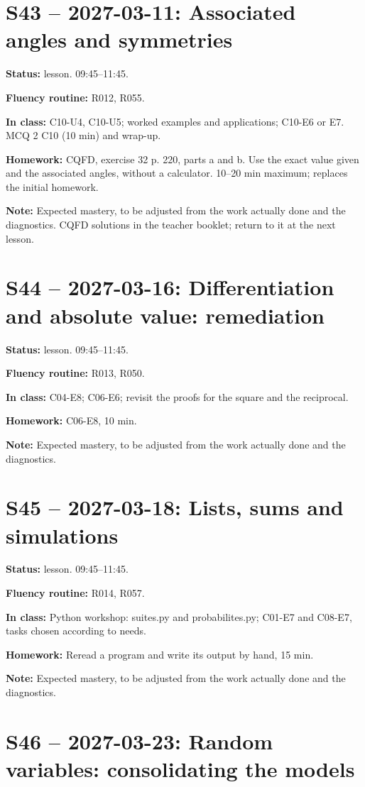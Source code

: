 \section*{S43 -- 2027-03-11: Associated angles and symmetries}
\textbf{Status:} lesson. 09:45–11:45.\par\textbf{Fluency routine:} R012, R055.\par\textbf{In class:} C10-U4, C10-U5; worked examples and applications; C10-E6 or E7.  MCQ 2 C10 (10 min) and wrap-up.\par\textbf{Homework:} CQFD, exercise 32 p. 220, parts a and b. Use the exact value given and the associated angles, without a calculator. 10–20 min maximum; replaces the initial homework.\par\textbf{Note:} Expected mastery, to be adjusted from the work actually done and the diagnostics. CQFD solutions in the teacher booklet; return to it at the next lesson.
\section*{S44 -- 2027-03-16: Differentiation and absolute value: remediation}
\textbf{Status:} lesson. 09:45–11:45.\par\textbf{Fluency routine:} R013, R050.\par\textbf{In class:} C04-E8; C06-E6; revisit the proofs for the square and the reciprocal.\par\textbf{Homework:} C06-E8, 10 min.\par\textbf{Note:} Expected mastery, to be adjusted from the work actually done and the diagnostics.
\section*{S45 -- 2027-03-18: Lists, sums and simulations}
\textbf{Status:} lesson. 09:45–11:45.\par\textbf{Fluency routine:} R014, R057.\par\textbf{In class:} Python workshop: suites.py and probabilites.py; C01-E7 and C08-E7, tasks chosen according to needs.\par\textbf{Homework:} Reread a program and write its output by hand, 15 min.\par\textbf{Note:} Expected mastery, to be adjusted from the work actually done and the diagnostics.
\section*{S46 -- 2027-03-23: Random variables: consolidating the models}
